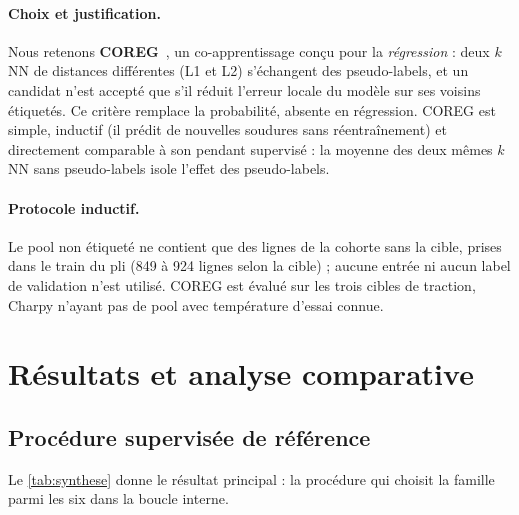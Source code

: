 \documentclass[11pt,a4paper]{article}
\begin{document}
\paragraph{Choix et justification.} Nous retenons \textbf{COREG}~\cite{zhou_li_2005},
un co-apprentissage conçu pour la \emph{régression} : deux $k$NN de distances
différentes (L1 et L2) s'échangent des pseudo-labels, et un candidat n'est
accepté que s'il réduit l'erreur locale du modèle sur ses voisins étiquetés. Ce
critère remplace la probabilité, absente en régression. COREG est simple,
inductif (il prédit de nouvelles soudures sans réentraînement) et directement
comparable à son pendant supervisé : la moyenne des deux mêmes $k$NN sans
pseudo-labels isole l'effet des pseudo-labels.

\paragraph{Protocole inductif.} Le pool non étiqueté ne contient que des lignes
de la cohorte sans la cible, prises dans le train du pli (849 à 924 lignes selon
la cible) ; aucune entrée ni aucun label de validation n'est utilisé. COREG est
évalué sur les trois cibles de traction, Charpy n'ayant pas de pool avec
température d'essai connue.

\section{Résultats et analyse comparative}
\label{sec:resultats}

\subsection{Procédure supervisée de référence}

Le \cref{tab:synthese} donne le résultat principal : la procédure qui choisit la
famille parmi les six dans la boucle interne.
\end{document}
